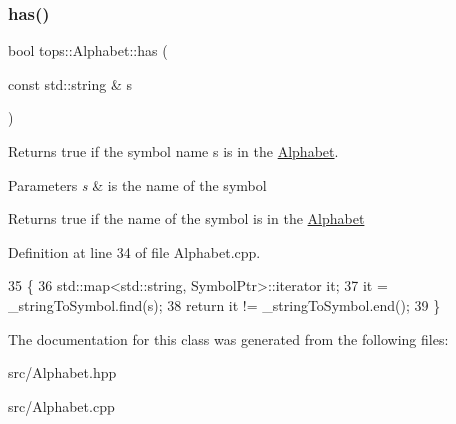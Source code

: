 \subsubsection{\texorpdfstring{has()}{has()}}
{\footnotesize\ttfamily bool tops\+::\+Alphabet\+::has (\begin{DoxyParamCaption}\item[{const std\+::string \&}]{s }\end{DoxyParamCaption})}



Returns true if the symbol name s is in the \hyperlink{classtops_1_1Alphabet}{Alphabet}. 


\begin{DoxyParams}{Parameters}
{\em s} & is the name of the symbol \\
\hline
\end{DoxyParams}
\begin{DoxyReturn}{Returns}
true if the name of the symbol is in the \hyperlink{classtops_1_1Alphabet}{Alphabet} 
\end{DoxyReturn}


Definition at line 34 of file Alphabet.\+cpp.


\begin{DoxyCode}
35   \{
36     std::map<std::string, SymbolPtr>::iterator it;
37     it = \_stringToSymbol.find(s);
38     \textcolor{keywordflow}{return} it != \_stringToSymbol.end();
39   \}
\end{DoxyCode}


The documentation for this class was generated from the following files\+:\begin{DoxyCompactItemize}
\item 
src/Alphabet.\+hpp\item 
src/Alphabet.\+cpp\end{DoxyCompactItemize}
